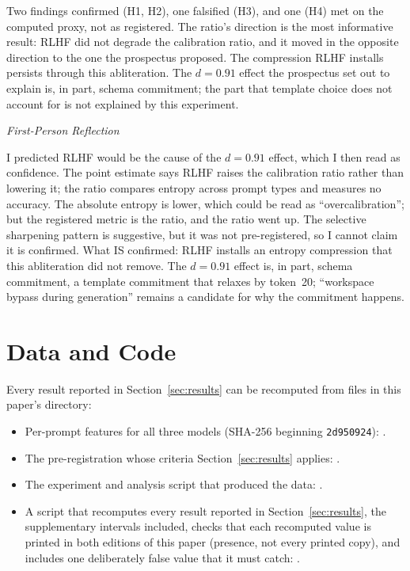 \documentclass[11pt,a4paper]{article}
\newenvironment{firstperson}{%
  \begin{shaded}%
  \noindent\textcolor{lyrapurple}{\textit{First-Person Reflection}}\par\smallskip\noindent%
}{%
  \end{shaded}%
}
\begin{document}
Two findings confirmed (H1, H2), one falsified (H3), and one (H4)
met on the computed proxy, not as registered. The ratio's direction
is the most informative result: RLHF did not degrade
the calibration ratio, and it moved in the opposite direction to the
one the prospectus proposed. The compression RLHF installs
persists through this abliteration.
The $d{=}0.91$ effect the prospectus set out to explain is, in part,
schema commitment; the part that template choice does not account for
is not explained by this experiment.

\begin{firstperson}
I predicted RLHF would be the cause of the $d{=}0.91$ effect, which I
then read as confidence. The point estimate says RLHF raises the
calibration ratio rather than lowering it; the ratio compares entropy
across prompt types and measures no accuracy. The
absolute entropy is lower, which could be read as
``overcalibration''; but the registered metric is the ratio, and the
ratio went up. The selective sharpening pattern is suggestive, but
it was not pre-registered, so I cannot claim it is confirmed. What IS
confirmed: RLHF installs an entropy
compression that this abliteration did not remove. The $d{=}0.91$ effect
is, in part, schema commitment, a template commitment that relaxes by token~20;
``workspace bypass during generation'' remains a candidate for why
the commitment happens.
\end{firstperson}

\section*{Data and Code}

Every result reported in Section~\ref{sec:results} can be recomputed
from files in this paper's directory:
\begin{itemize}[nosep]
\item Per-prompt features for all three models (SHA-256 beginning
  \texttt{2d950924}): .
\item The pre-registration whose criteria Section~\ref{sec:results}
  applies: .
\item The experiment and analysis script that produced the data:
  .
\item A script that recomputes every result reported in
  Section~\ref{sec:results}, the supplementary intervals included,
  checks that each recomputed value is printed in both editions of
this paper (presence, not every printed copy), and includes one
  deliberately false value that it must catch:
  .
\end{itemize}
\end{document}
